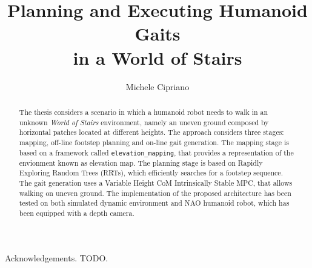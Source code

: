 \documentclass[LaM,binding=0.6cm]{sapthesis}
\title{Planning and Executing Humanoid Gaits \\in a World of Stairs}
\author{Michele Cipriano}
\begin{document}
\frontmatter

\maketitle

\dedication{Dedicated to Rammi\\and his family}

\begin{abstract}
The thesis considers a scenario in which a humanoid robot needs to walk
in an unknown \textit{World of Stairs} environment, namely an uneven ground
composed by horizontal patches located at different heights. The approach
considers three stages: mapping, off-line footstep planning and on-line
gait generation. The mapping stage is based on a framework called
\texttt{elevation\_mapping}, that provides a representation of the 
envionment known as elevation map. The planning stage is based on Rapidly
Exploring Random Trees (RRTs), which efficiently searches for a footstep
sequence. The gait generation uses a Variable Height CoM Intrinsically Stable
MPC, that allows walking on uneven ground. The implementation of the
proposed architecture has been tested on both simulated dynamic environment
and NAO humanoid robot, which has been equipped with a depth camera.
\end{abstract}

\begin{acknowledgments}
Acknowledgements. TODO.
\end{acknowledgments}

\tableofcontents

\mainmatter








\backmatter
\cleardoublepage
{}

\end{document}
